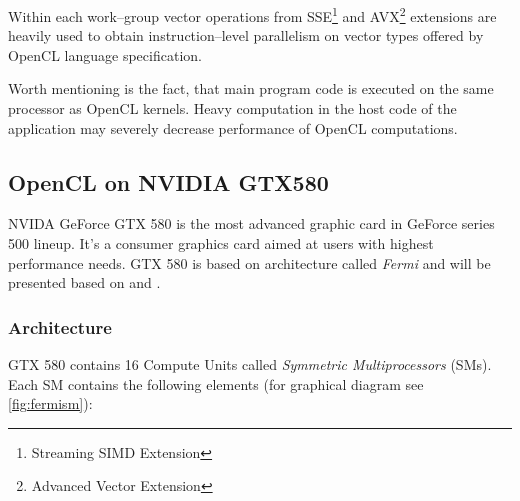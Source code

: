 Within each work--group vector operations from SSE\footnote{Streaming SIMD
Extension} and AVX\footnote{Advanced Vector Extension} extensions are heavily
used to obtain instruction--level parallelism on vector types offered by OpenCL
language specification.

Worth mentioning is the fact, that main program code is executed on the same
processor as OpenCL kernels. Heavy computation in the host code of the application
may severely decrease performance of OpenCL computations.

\subsection{OpenCL on NVIDIA GTX580}

NVIDA GeForce GTX 580 is the most advanced graphic card in GeForce series 500 lineup.
It's a consumer graphics card aimed at users with highest performance needs.
GTX 580 is based on architecture called \emph{Fermi} and will be presented based on
\cite[p59]{gaster2012heterogeneous} and \cite{nvidiafermi}.

\subsubsection{Architecture}
GTX 580 contains 16 Compute Units called \emph{Symmetric Multiprocessors} (SMs).
Each SM contains the following elements (for graphical diagram see
\autoref{fig:fermism}):

